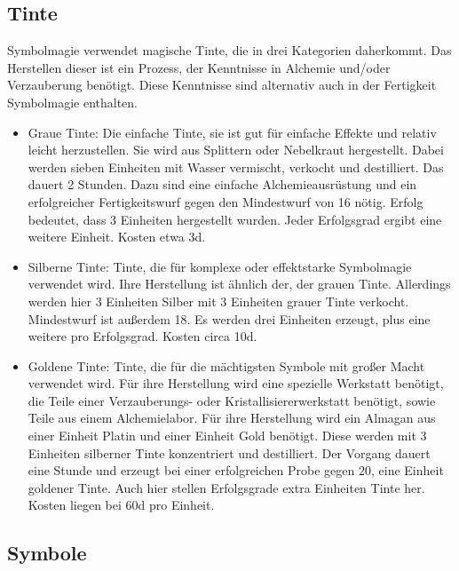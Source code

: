\documentclass{article}
\begin{document}
\begin{center}
\subsection{Tinte}
\end{center}

Symbolmagie verwendet magische Tinte, die in drei Kategorien daherkommt. Das Herstellen dieser ist ein Prozess, der
Kenntnisse in Alchemie und/oder Verzauberung benötigt. Diese Kenntnisse sind alternativ auch in der Fertigkeit
Symbolmagie enthalten.

\begin{itemize}
\item Graue Tinte: Die einfache Tinte, sie ist gut für einfache Effekte und relativ leicht herzustellen. Sie wird aus Splittern oder Nebelkraut hergestellt. Dabei werden sieben Einheiten mit Wasser vermischt, verkocht und destilliert. Das dauert 2 Stunden. Dazu sind eine einfache Alchemieausrüstung und ein erfolgreicher Fertigkeitswurf gegen den Mindestwurf von 16 nötig. Erfolg bedeutet, dass 3 Einheiten hergestellt wurden. Jeder Erfolgsgrad ergibt eine weitere Einheit. Kosten etwa 3d.
\item Silberne Tinte: Tinte, die für komplexe oder effektstarke Symbolmagie verwendet wird. Ihre Herstellung ist ähnlich der, der grauen Tinte. Allerdings werden hier 3 Einheiten Silber mit 3 Einheiten grauer Tinte verkocht. Mindestwurf ist außerdem 18. Es werden drei Einheiten erzeugt, plus eine weitere pro Erfolgsgrad. Kosten circa 10d.
\item Goldene Tinte: Tinte, die für die mächtigsten Symbole mit großer Macht verwendet wird. Für ihre Herstellung wird eine spezielle Werkstatt benötigt, die Teile einer Verzauberungs- oder Kristallisiererwerkstatt benötigt, sowie Teile aus einem Alchemielabor. Für ihre Herstellung wird ein Almagan aus einer Einheit Platin und einer Einheit Gold benötigt. Diese werden mit 3 Einheiten silberner Tinte konzentriert und destilliert. Der Vorgang dauert eine Stunde und erzeugt bei einer erfolgreichen Probe gegen 20, eine Einheit goldener Tinte. Auch hier stellen Erfolgsgrade extra Einheiten Tinte her. Kosten liegen bei 60d pro Einheit.
\end{itemize}

\begin{center}
\subsection{Symbole}
\end{center}
\end{document}
